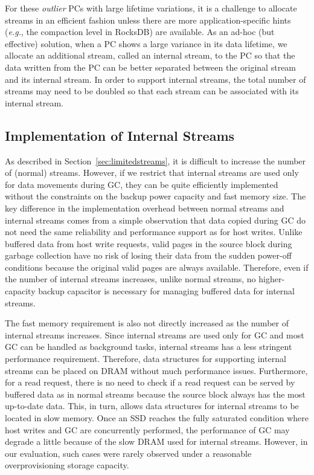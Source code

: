 For these {\it outlier} PCs with large lifetime variations, 
it is a challenge to allocate streams in an efficient fashion unless 
there are more application-specific hints ({\it e.g.}, the compaction level in
RocksDB) are available.  
As an ad-hoc (but effective) solution, when a PC shows a large variance 
in its data lifetime, we allocate an additional stream, called an internal stream, 
to the PC so that
the data written from the PC can be better separated between the original 
stream and its internal stream.  
In order to support internal streams, the total number of streams may 
need to be doubled so
that each stream can be associated with its internal stream.

\subsection{Implementation of Internal Streams}
As described in Section~\ref{sec:limitedstreams}, it is difficult to increase the number of 
(normal) streams.  However, 
if we restrict that internal streams are used only for data movements
during GC,
they can be quite efficiently
implemented without the constraints on the backup power capacity and fast memory size.  
The key difference in the implementation overhead between normal streams and 
internal streams comes from a simple observation that data copied during 
GC do not need the same reliability and performance support as for host writes.  
Unlike buffered data from host write requests, valid pages in
the source block during garbage collection have no risk of losing their data 
from the sudden power-off conditions because the original valid pages are always available.    
Therefore, even if the
number of internal streams increases, unlike normal streams, 
no higher-capacity backup capacitor is necessary for managing buffered data for internal streams. 

The fast memory requirement is also not directly increased as the number 
of internal streams increases.   
Since internal streams are used only for GC and most GC can be handled as background tasks,
internal streams has a less stringent performance requirement.  
Therefore, data structures for supporting internal streams can be placed 
on DRAM without much performance issues.  
Furthermore, for a read request, there is no need to check if a read request 
can be served by buffered data as in normal streams because the source block always 
has the most up-to-date data.  
This, in turn, allows data structures for internal streams to be located in slow memory.
Once an SSD reaches the fully saturated condition where host writes and GC 
are concurrently performed, the performance of GC may degrade a little because of
the slow DRAM used for internal streams.   
However, in our evaluation, such cases were rarely observed under a 
reasonable overprovisioning storage capacity.


